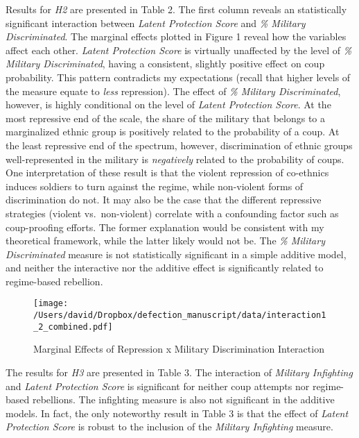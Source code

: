 \documentclass[12pt,]{article}
\theoremstyle{definition}
\theoremstyle{definition}
\theoremstyle{definition}
\theoremstyle{remark}
\begin{document}
\singlespacing



\doublespacing

Results for \emph{H2} are presented in Table 2. The first column reveals
an statistically significant interaction between \emph{Latent Protection
Score} and \emph{\% Military Discriminated}. The marginal effects
plotted in Figure 1 reveal how the variables affect each other.
\emph{Latent Protection Score} is virtually unaffected by the level of
\emph{\% Military Discriminated}, having a consistent, slightly positive
effect on coup probability. This pattern contradicts my expectations
(recall that higher levels of the measure equate to \emph{less}
repression). The effect of \emph{\% Military Discriminated}, however, is
highly conditional on the level of \emph{Latent Protection Score}. At
the most repressive end of the scale, the share of the military that
belongs to a marginalized ethnic group is positively related to the
probability of a coup. At the least repressive end of the spectrum,
however, discrimination of ethnic groups well-represented in the
military is \emph{negatively} related to the probability of coups. One
interpretation of these result is that the violent repression of
co-ethnics induces soldiers to turn against the regime, while
non-violent forms of discrimination do not. It may also be the case that
the different repressive strategies (violent vs.~non-violent) correlate
with a confounding factor such as coup-proofing efforts. The former
explanation would be consistent with my theoretical framework, while the
latter likely would not be. The \emph{\% Military Discriminated} measure
is not statistically significant in a simple additive model, and neither
the interactive nor the additive effect is significantly related to
regime-based rebellion.

\singlespacing



\doublespacing

\begin{figure}
\centering
\texttt{[image: /Users/david/Dropbox/defection\_manuscript/data/interaction1\_2\_combined.pdf]}
\caption{Marginal Effects of Repression x Military Discrimination
Interaction}
\end{figure}

The results for \emph{H3} are presented in Table 3. The interaction of
\emph{Military Infighting} and \emph{Latent Protection Score} is
significant for neither coup attempts nor regime-based rebellions. The
infighting measure is also not significant in the additive models. In
fact, the only noteworthy result in Table 3 is that the effect of
\emph{Latent Protection Score} is robust to the inclusion of the
\emph{Military Infighting} measure.
\end{document}

